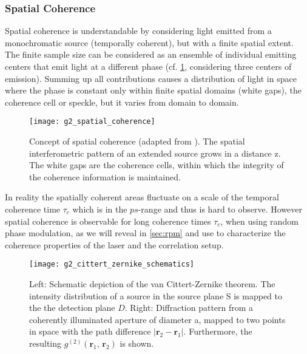 \subsubsection{Spatial Coherence}\label{sec:spatial_coherence}
Spatial coherence is understandable by considering light emitted from a monochromatic source (temporally coherent), but with a finite spatial extent. The finite sample size can be considered as an ensemble of individual emitting centers that emit light at a different phase (cf. \cref{fig:spatial_coherence}, considering three centers of emission). Summing up all contributions causes a distribution of light in space where the phase is constant only within finite spatial domains (white gaps), the coherence cell or speckle, but it varies from domain to domain.
\begin{figure}[h!]
	\centering
	\texttt{[image: g2\_spatial\_coherence]}
	\caption{Concept of spatial coherence (adapted from \cite{pieper_visualizing_2019}). The spatial interferometric pattern of an extended source grows in a distance z. The white gaps are the coherence cells, within which the integrity of the coherence information is maintained.}
	\label{fig:spatial_coherence}
\end{figure} 
\noindent In reality the spatially coherent areas fluctuate on a scale of the temporal coherence time $\tau_c$ which is in the $ps$-range and thus is hard to observe. However spatial coherence is observable for long coherence times $\tau_c$, when using random phase modulation, as we will reveal in \cref{sec:rpm} and use to characterize the coherence properties of the laser and the correlation setup.
\begin{figure}[h!]
	\centering
	\texttt{[image: g2\_cittert\_zernike\_schematics]}
	\caption{Left: Schematic depiction of the van Cittert-Zernike theorem. The intensity distribution of a source in the source plane S is mapped to the the detection plane $D$. Right: Diffraction pattern from a coherently illuminated aperture of diameter a, mapped to two points in space with the path difference $|\boldsymbol{r}_2-\boldsymbol{r}_1|$. Furthermore, the resulting $g^{(2)}(\boldsymbol{r}_1,\,\boldsymbol{r}_2)$ is shown.}
	\label{fig:cittert}
\end{figure}
